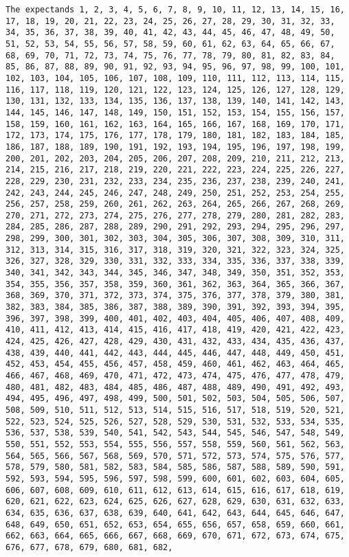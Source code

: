 \documentclass[
  letterpaper,
  DIV=11,
  numbers=noendperiod]{scrartcl}
\begin{document}
\begin{verbatim}
The expectands 1, 2, 3, 4, 5, 6, 7, 8, 9, 10, 11, 12, 13, 14, 15, 16, 17, 18, 19, 20, 21, 22, 23, 24, 25, 26, 27, 28, 29, 30, 31, 32, 33, 34, 35, 36, 37, 38, 39, 40, 41, 42, 43, 44, 45, 46, 47, 48, 49, 50, 51, 52, 53, 54, 55, 56, 57, 58, 59, 60, 61, 62, 63, 64, 65, 66, 67, 68, 69, 70, 71, 72, 73, 74, 75, 76, 77, 78, 79, 80, 81, 82, 83, 84, 85, 86, 87, 88, 89, 90, 91, 92, 93, 94, 95, 96, 97, 98, 99, 100, 101, 102, 103, 104, 105, 106, 107, 108, 109, 110, 111, 112, 113, 114, 115, 116, 117, 118, 119, 120, 121, 122, 123, 124, 125, 126, 127, 128, 129, 130, 131, 132, 133, 134, 135, 136, 137, 138, 139, 140, 141, 142, 143, 144, 145, 146, 147, 148, 149, 150, 151, 152, 153, 154, 155, 156, 157, 158, 159, 160, 161, 162, 163, 164, 165, 166, 167, 168, 169, 170, 171, 172, 173, 174, 175, 176, 177, 178, 179, 180, 181, 182, 183, 184, 185, 186, 187, 188, 189, 190, 191, 192, 193, 194, 195, 196, 197, 198, 199, 200, 201, 202, 203, 204, 205, 206, 207, 208, 209, 210, 211, 212, 213, 214, 215, 216, 217, 218, 219, 220, 221, 222, 223, 224, 225, 226, 227, 228, 229, 230, 231, 232, 233, 234, 235, 236, 237, 238, 239, 240, 241, 242, 243, 244, 245, 246, 247, 248, 249, 250, 251, 252, 253, 254, 255, 256, 257, 258, 259, 260, 261, 262, 263, 264, 265, 266, 267, 268, 269, 270, 271, 272, 273, 274, 275, 276, 277, 278, 279, 280, 281, 282, 283, 284, 285, 286, 287, 288, 289, 290, 291, 292, 293, 294, 295, 296, 297, 298, 299, 300, 301, 302, 303, 304, 305, 306, 307, 308, 309, 310, 311, 312, 313, 314, 315, 316, 317, 318, 319, 320, 321, 322, 323, 324, 325, 326, 327, 328, 329, 330, 331, 332, 333, 334, 335, 336, 337, 338, 339, 340, 341, 342, 343, 344, 345, 346, 347, 348, 349, 350, 351, 352, 353, 354, 355, 356, 357, 358, 359, 360, 361, 362, 363, 364, 365, 366, 367, 368, 369, 370, 371, 372, 373, 374, 375, 376, 377, 378, 379, 380, 381, 382, 383, 384, 385, 386, 387, 388, 389, 390, 391, 392, 393, 394, 395, 396, 397, 398, 399, 400, 401, 402, 403, 404, 405, 406, 407, 408, 409, 410, 411, 412, 413, 414, 415, 416, 417, 418, 419, 420, 421, 422, 423, 424, 425, 426, 427, 428, 429, 430, 431, 432, 433, 434, 435, 436, 437, 438, 439, 440, 441, 442, 443, 444, 445, 446, 447, 448, 449, 450, 451, 452, 453, 454, 455, 456, 457, 458, 459, 460, 461, 462, 463, 464, 465, 466, 467, 468, 469, 470, 471, 472, 473, 474, 475, 476, 477, 478, 479, 480, 481, 482, 483, 484, 485, 486, 487, 488, 489, 490, 491, 492, 493, 494, 495, 496, 497, 498, 499, 500, 501, 502, 503, 504, 505, 506, 507, 508, 509, 510, 511, 512, 513, 514, 515, 516, 517, 518, 519, 520, 521, 522, 523, 524, 525, 526, 527, 528, 529, 530, 531, 532, 533, 534, 535, 536, 537, 538, 539, 540, 541, 542, 543, 544, 545, 546, 547, 548, 549, 550, 551, 552, 553, 554, 555, 556, 557, 558, 559, 560, 561, 562, 563, 564, 565, 566, 567, 568, 569, 570, 571, 572, 573, 574, 575, 576, 577, 578, 579, 580, 581, 582, 583, 584, 585, 586, 587, 588, 589, 590, 591, 592, 593, 594, 595, 596, 597, 598, 599, 600, 601, 602, 603, 604, 605, 606, 607, 608, 609, 610, 611, 612, 613, 614, 615, 616, 617, 618, 619, 620, 621, 622, 623, 624, 625, 626, 627, 628, 629, 630, 631, 632, 633, 634, 635, 636, 637, 638, 639, 640, 641, 642, 643, 644, 645, 646, 647, 648, 649, 650, 651, 652, 653, 654, 655, 656, 657, 658, 659, 660, 661, 662, 663, 664, 665, 666, 667, 668, 669, 670, 671, 672, 673, 674, 675, 676, 677, 678, 679, 680, 681, 682, 
\end{verbatim}
\end{document}
